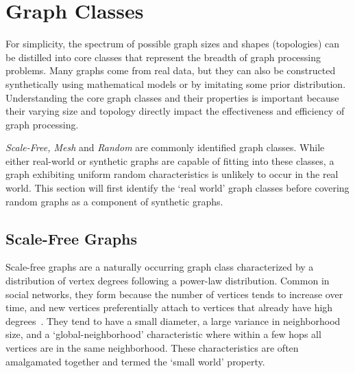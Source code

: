 \section{Graph Classes}
\label{section:22-graph-classes}



For simplicity, the spectrum of possible graph sizes and shapes (topologies) can be distilled into core classes that represent the breadth of graph processing problems. 
Many graphs come from real data, but they can also be constructed synthetically using mathematical models or by imitating some prior distribution.
Understanding the core graph classes and their properties is important because their varying size and topology directly impact the effectiveness and efficiency of graph processing. 



\textit{Scale-Free, Mesh} and \textit{Random} are commonly identified graph classes. 
While either real-world or synthetic graphs are capable of fitting into these classes, a graph exhibiting uniform random characteristics is unlikely to occur in the real world.
This section will first identify the `real world' graph classes before covering random graphs as a component of synthetic graphs. 

\subsection{Scale-Free Graphs}
Scale-free graphs are a naturally occurring graph class characterized by a distribution of vertex degrees  following a power-law distribution. 
Common in social networks, they form because the number of vertices tends to increase over time, and new vertices preferentially attach to vertices that already have high degrees~\cite{Barabasi1999a}. 
They tend to have a small diameter, a large variance in neighborhood size, and a `global-neighborhood' characteristic where within a few hops all vertices are in the same neighborhood.
These characteristics are often amalgamated together and termed the `small world' property.

